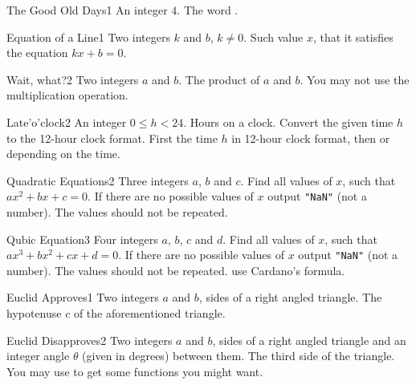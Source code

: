 \begin{task}{The Good Old Days}{1}
\In
An integer $4$.
\Out
The word .
\end{task}

\begin{task}{Equation of a Line}{1}
\In
Two integers $k$ and $b$, $k \neq 0$.
\Out
Such value $x$, that it satisfies the equation $kx+b=0$. 
\end{task}

\begin{task}{Wait, what?}{2}
\In
Two integers $a$ and $b$.
\Out
The product of $a$ and $b$.
\Note
You may not use the multiplication operation.
\end{task}

\begin{task}{Late'o'clock}{2}
\In An integer $0 \leq h < 24$. Hours on a clock.
\Note Convert the given time $h$ to the 12-hour clock format.
\Out First the time $h$ in 12-hour clock format, then  or 
depending on the time.
\end{task}

\begin{task}{Quadratic Equations}{2}
\In
Three integers $a$, $b$ and $c$.
\Out
Find all values of $x$, such that $ax^2 + bx + c=0$. 
\Note
If there are no possible values of $x$ output \texttt{"NaN"} (not a number). 
The values should not be repeated.
\end{task}

\begin{task}{Qubic Equation}{3}
\In
Four integers $a$, $b$, $c$ and $d$.
\Out
Find all values of $x$, such that $ax^3 + bx^2 + cx + d = 0$. 
\Note
If there are no possible values of $x$ output \texttt{"NaN"} (not a number). 
The values should not be repeated.
\Hint
use Cardano's formula.
\end{task}

\begin{task}{Euclid Approves}{1}
\In
Two integers $a$ and $b$, sides of a right angled triangle.
\Out
The hypotenuse $c$ of the aforementioned triangle.
\end{task}

\begin{task}{Euclid Disapproves}{2}
\In
Two integers $a$ and $b$, sides of a right angled triangle and an integer angle
$\theta$ (given in degrees) between them.
\Out
The third side of the triangle.
\Hint
You may use  to get some functions you might want.
\end{task}

